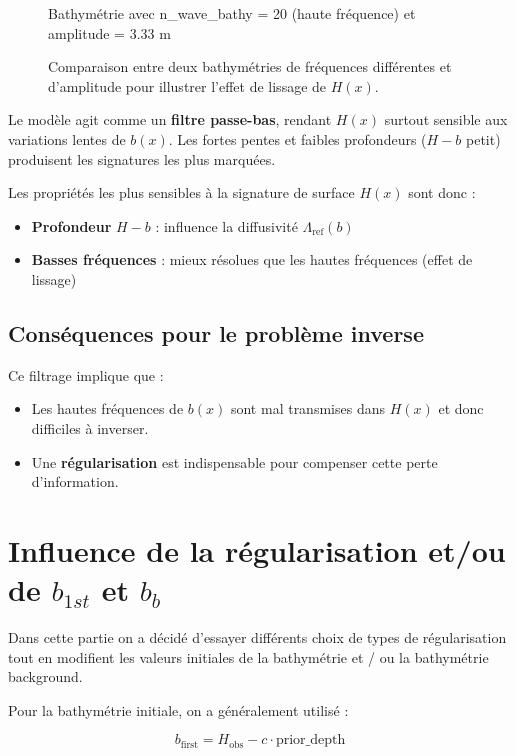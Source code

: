 \documentclass{article}
\begin{document}
\begin{figure}[H]
\begin{minipage}[b]{0.45\linewidth}
        \caption{Bathymétrie avec n\_wave\_bathy = 20 (haute fréquence) et amplitude = 3.33 m}
        \label{fig:bathy_high}
    \end{minipage}
    \caption*{\small Comparaison entre deux bathymétries de fréquences différentes et d'amplitude pour illustrer l’effet de lissage de $H(x)$.}
    \label{fig:bathy_all}
\end{figure}

Le modèle agit comme un \textbf{filtre passe-bas}, rendant $H(x)$ surtout sensible aux variations lentes de $b(x)$. Les fortes pentes et faibles profondeurs ($H-b$ petit) produisent les signatures les plus marquées.

Les propriétés les plus sensibles à la signature de surface $H(x)$ sont donc :
\begin{itemize}
    \item \textbf{Profondeur} $H-b$ : influence la diffusivité $\Lambda_{\text{ref}}(b)$ 
    \item \textbf{Basses fréquences} : mieux résolues que les hautes fréquences (effet de lissage)
\end{itemize}

\subsection{Conséquences pour le problème inverse}

Ce filtrage implique que :
\begin{itemize}
    \item Les hautes fréquences de $b(x)$ sont mal transmises dans $H(x)$ et donc difficiles à inverser.
    \item Une \textbf{régularisation} est indispensable pour compenser cette perte d’information.
\end{itemize}


\section{Influence de la régularisation et/ou de $b_{1st}$ et $b_b$}


Dans cette partie on a décidé d'essayer différents choix de types de régularisation tout en modifient les valeurs initiales de la bathymétrie et / ou la bathymétrie background.

Pour la bathymétrie initiale, on a généralement utilisé : 


$$b_{\text{first}} = H_{\text{obs}} - c \cdot \text{prior\_depth} $$
\end{document}
